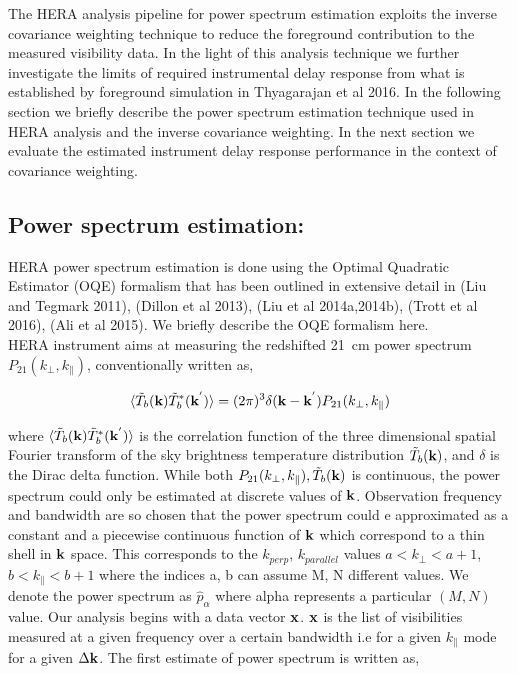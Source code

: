 \documentclass[twocolumn]{emulateapj}
\begin{document}
The HERA analysis pipeline for power spectrum estimation exploits the inverse covariance weighting technique to reduce the foreground contribution to the measured visibility data. In the light of this analysis technique we further investigate the limits of required instrumental delay response from what is established by foreground simulation in Thyagarajan et al 2016. In the following section we briefly describe the power spectrum estimation technique used in HERA analysis and the inverse covariance weighting. In the next section we evaluate the estimated instrument delay response performance in the context of covariance weighting.

\subsection{Power spectrum estimation:}

HERA power spectrum estimation is done using the Optimal Quadratic Estimator
(OQE) formalism that has been outlined in extensive detail in (Liu and Tegmark
2011), (Dillon et al 2013), (Liu et al 2014a,2014b), (Trott et al 2016), (Ali
et al 2015). We briefly  describe the OQE formalism here.\\ HERA instrument
aims at measuring the redshifted 21~cm power spectrum
$P_{21}(k_\perp,k_\parallel)$, conventionally written as, 

\begin{equation}
\langle  \tilde T_{b}(\bold k) \tilde T_{b}^{*}(\bold k^{'}) \rangle = (2\pi)^{3} \delta (\bold k - \bold k^{'})P_{21}(k_\perp,k_\parallel)
\label{eq14}
\end{equation}

where $\langle  \tilde T_{b}(\bold k) \tilde T_{b}^{*}(\bold k^{'}) \rangle $ is the correlation function of the three dimensional spatial Fourier transform of the sky brightness temperature distribution $ \tilde T_{b}(\bold k)$, and $\delta$ is the Dirac delta function. While both $P_{21}(k_\perp,k_\parallel), \tilde T_{b}({\bold k})$ is continuous, the power spectrum could only be estimated at discrete values of $\bold k$. Observation frequency and bandwidth are so chosen that the power spectrum could e approximated as a constant and a piecewise continuous function of $\bold k$  which correspond to a thin shell in $\bold k$ space. This corresponds to the $k_{perp}$, $k_{parallel}$  values $a <k_{\perp} < a+1$, $b <k_{\parallel} < b+1$ where the indices a, b can assume M, N different values.  We denote the power spectrum as $\hat p_{\alpha}$ where alpha represents a particular $(M,N)$ value. Our analysis begins with a data vector $\bold x$. $\bold x$ is the list of visibilities measured at a given frequency over a certain bandwidth i.e for a given $k_{\parallel}$ mode for a given $\Delta \bold k $. The first estimate of power spectrum is written as, 
\end{document}

